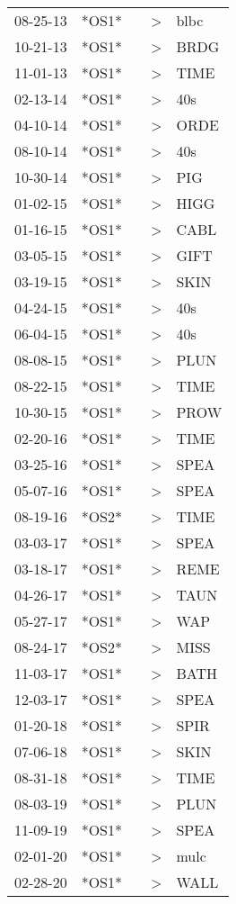 \begin{supertabular}{lllll}
 08-25-13 &  *OS1* &   &  \textgreater &  blbc \\
 10-21-13 &  *OS1* &   &  \textgreater &  BRDG \\
 11-01-13 &  *OS1* &   &  \textgreater &  TIME \\
 02-13-14 &  *OS1* &   &  \textgreater &   40s \\
 04-10-14 &  *OS1* &   &  \textgreater &  ORDE \\
 08-10-14 &  *OS1* &   &  \textgreater &   40s \\
 10-30-14 &  *OS1* &   &  \textgreater &   PIG \\
 01-02-15 &  *OS1* &   &  \textgreater &  HIGG \\
 01-16-15 &  *OS1* &   &  \textgreater &  CABL \\
 03-05-15 &  *OS1* &   &  \textgreater &  GIFT \\
 03-19-15 &  *OS1* &   &  \textgreater &  SKIN \\
 04-24-15 &  *OS1* &   &  \textgreater &   40s \\
 06-04-15 &  *OS1* &   &  \textgreater &   40s \\
 08-08-15 &  *OS1* &   &  \textgreater &  PLUN \\
 08-22-15 &  *OS1* &   &  \textgreater &  TIME \\
 10-30-15 &  *OS1* &   &  \textgreater &  PROW \\
 02-20-16 &  *OS1* &   &  \textgreater &  TIME \\
 03-25-16 &  *OS1* &   &  \textgreater &  SPEA \\
 05-07-16 &  *OS1* &   &  \textgreater &  SPEA \\
 08-19-16 &  *OS2* &   &  \textgreater &  TIME \\
 03-03-17 &  *OS1* &   &  \textgreater &  SPEA \\
 03-18-17 &  *OS1* &   &  \textgreater &  REME \\
 04-26-17 &  *OS1* &   &  \textgreater &  TAUN \\
 05-27-17 &  *OS1* &   &  \textgreater &   WAP \\
 08-24-17 &  *OS2* &   &  \textgreater &  MISS \\
 11-03-17 &  *OS1* &   &  \textgreater &  BATH \\
 12-03-17 &  *OS1* &   &  \textgreater &  SPEA \\
 01-20-18 &  *OS1* &   &  \textgreater &  SPIR \\
 07-06-18 &  *OS1* &   &  \textgreater &  SKIN \\
 08-31-18 &  *OS1* &   &  \textgreater &  TIME \\
 08-03-19 &  *OS1* &   &  \textgreater &  PLUN \\
 11-09-19 &  *OS1* &   &  \textgreater &  SPEA \\
 02-01-20 &  *OS1* &   &  \textgreater &  mulc \\
 02-28-20 &  *OS1* &   &  \textgreater &  WALL \\
\end{supertabular}
